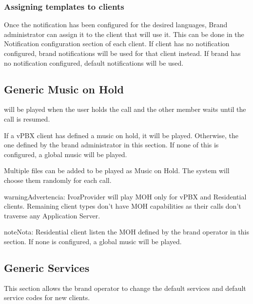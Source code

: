 \documentclass[letterpaper,10pt,spanish]{sphinxmanual}
\begin{document}
\subsubsection{Assigning templates to clients}
\label{administration_portal/brand/settings/notification_templates:assigning-templates-to-clients}
Once the notification has been configured for the desired languages, Brand administrator can assign it to the
client that will use it. This can be done in the Notification configuration section of each client.
If client has no notification configured, brand notifications will be used for that client instead. If brand has no
notification configured, default notifications will be used.


\subsection{Generic Music on Hold}
\label{administration_portal/brand/settings/generic_music_on_hold:generic-music-on-hold}\label{administration_portal/brand/settings/generic_music_on_hold::doc}
{\hyperref[administration_portal/client/vpbx/multimedia/music_on_hold:music\string-on\string-hold]{}} will be played when the user holds the call and the other
member waits until the call is resumed.

If a vPBX client has defined a music on hold, it will be played. Otherwise, the
one defined by the brand administrator in this section. If none of this is configured,
a global music will be played.

Multiple files can be added to be played as Music on Hold. The system will choose them randomly for each call.

\begin{notice}{warning}{Advertencia:}
IvozProvider will play MOH only for vPBX and Residential clients. Remaining client
types don't have MOH capabilities as their calls don't traverse any Application Server.
\end{notice}

\begin{notice}{note}{Nota:}
Residential client listen the MOH defined by the brand operator in this section. If none is configured,
a global music will be played.
\end{notice}


\subsection{Generic Services}
\label{administration_portal/brand/settings/generic_services:generic-services}\label{administration_portal/brand/settings/generic_services::doc}\label{administration_portal/brand/settings/generic_services:brand-services}
This section allows the brand operator to change the default services and default service codes for new clients.
\end{document}

